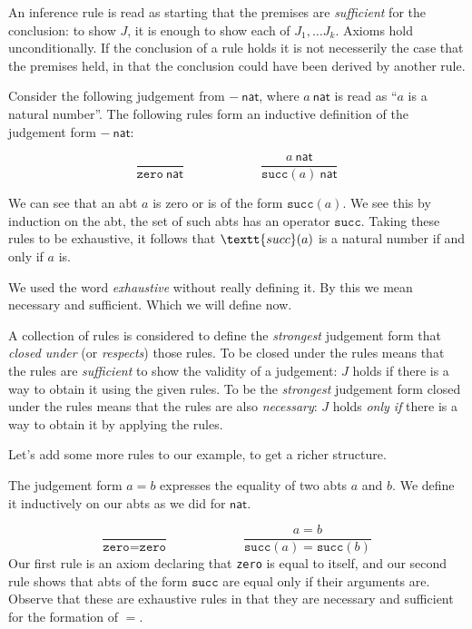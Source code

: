 \begin{remark}
    An inference rule is read as starting that the premises are \emph{sufficient} for the conclusion: to show $J$, it is enough to show each of $J_1, \dots J_k$. Axioms hold unconditionally. If the conclusion of a rule holds it is not necesserily the case that the premises held, in that the conclusion could have been derived by another rule.
\end{remark}

\begin{example}
    Consider the following judgement from $-\ \mathsf{nat}$, where $a\ \mathsf{nat}$ is read as ``$a$ is a natural number''. The following rules form an inductive definition of the judgement form $-\ \mathsf{nat}$:

    $$\frac
        {}
        {\texttt{zero}\ \mathsf{nat}}
      \qquad\qquad\qquad
      \frac
        {a\ \mathsf{nat}}
        {\texttt{succ}(a)\ \mathsf{nat}}
    $$

    We can see that an abt $a$ is zero or is of the form $\texttt{succ}(a)$. We see this by induction on the abt, the set of such abts has an operator $\texttt{succ}$. Taking these rules to be exhaustive, it follows that $\textt{succ}(a)$ is a natural number if and only if $a$ is.
\end{example}

\begin{remark}
    We used the word \emph{exhaustive} without really defining it. By this we mean necessary and sufficient. Which we will define now.
\end{remark}

\begin{defin}
    A collection of rules is considered to define the \emph{strongest} judgement form that \emph{closed under} (or \emph{respects}) those rules. To be closed under the rules means that the rules are \emph{sufficient} to show the validity of a judgement: $J$ holds if there is a way to obtain it using the given rules. To be the \emph{strongest} judgement form closed under the rules means that the rules are also \emph{necessary}: $J$ holds \emph{only if} there is a way to obtain it by applying the rules.
\end{defin}

Let's add some more rules to our example, to get a richer structure.

\begin{example}
    The judgement form $a = b$ expresses the equality of two abts $a$ and $b$. We define it inductively on our abts as we did for $\mathsf{nat}$.
    
    $$\frac
        {}
        {\texttt{zero} = \texttt{zero}}
      \qquad\qquad\qquad
    \frac
        {a = b}
        {\texttt{succ}(a) = \texttt{succ}(b)}
    $$
    Our first rule is an axiom declaring that \texttt{zero} is equal to itself, and our second rule shows that abts of the form $\texttt{succ}$ are equal only if their arguments are. Observe that these are exhaustive rules in that they are necessary and sufficient for the formation of $=$.
\end{example}

